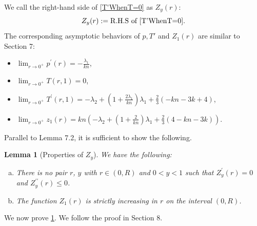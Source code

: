 \documentclass{amsart}
\numberwithin{equation}{section}
\theoremstyle{plain}
\newtheorem{cor}[theorem]{Corollary}
\newtheorem{lemma}[theorem]{Lemma}
\theoremstyle{definition}
\theoremstyle{remark}
\begin{document}
We call the right-hand side of \cref{T'WhenT=0} as $Z_y(r)$:
\[Z_y(r):=\text{R.H.S of \cref{T'WhenT=0}.} \]
The corresponding asymptotic behaviors of $p, T'$ and $Z_1(r)$ are similar to \cite[page 267]{benguria2007second} Section 7:
\begin{itemize}
    \item $\lim _{r \rightarrow 0^{+}} p^{\prime}(r)=-\frac{\lambda_1}{k n}$,
    \item $\lim _{r \rightarrow 0^{+}} T(r, 1)=0$,
    \item $\lim _{r \rightarrow 0^{+}} T^{\prime}(r, 1)=-\lambda_2+\left(1+\frac{2 \lambda_1}{k n}\right) \lambda_1+\frac{2}{3}(-k n-3 k+4)$,
    \item $\lim _{r \rightarrow 0^{+}} z_1(r)=k n\left(-\lambda_2+\left(1+\frac{2}{k n}\right) \lambda_1+\frac{2}{3}(4-k n-3 k)\right)$.
\end{itemize}
Parallel to \cite{benguria2007second} Lemma 7.2, it is sufficient to show the following.
\begin{lemma}[Properties of $Z_y$]\label{PropertiesOfZy}
    We have the following: 
    \begin{enumerate}[a.]
        \item There is no pair $r$, $y$ with $r \in(0, R)$ and $0<y<1$ such that $Z_y^{\prime}(r)=0$ and $Z_y^{\prime \prime}(r) \leq 0$.\\
        \item The function $Z_1(r)$ is strictly increasing in $r$ on the interval $(0, R)$.
    \end{enumerate}

\end{lemma}





\par We  now prove \cref{PropertiesOfZy}. We follow the proof in \cite{benguria2007second} Section 8.

\end{document}
